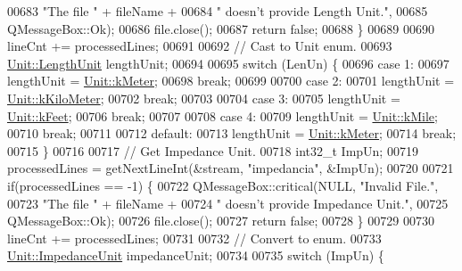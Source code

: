 \begin{DoxyCode}
00683                           \textcolor{stringliteral}{"The file "} + fileName +
00684                           \textcolor{stringliteral}{" doesn't provide Length Unit."},
00685                           QMessageBox::Ok);
00686     file.close();
00687     \textcolor{keywordflow}{return} \textcolor{keyword}{false};
00688   \}
00689 
00690   lineCnt += processedLines;
00691 
00692   \textcolor{comment}{// Cast to Unit enum.}
00693   \hyperlink{class_unit_a8c8921f7b225ad6063b1cb573425b9a0}{Unit::LengthUnit} lengthUnit;
00694 
00695   \textcolor{keywordflow}{switch} (LenUn) \{
00696   \textcolor{keywordflow}{case} 1:
00697     lengthUnit = \hyperlink{class_unit_a8c8921f7b225ad6063b1cb573425b9a0abfa41ebe7ee649a1f02c9b8ae570434b}{Unit::kMeter};
00698     \textcolor{keywordflow}{break};
00699 
00700   \textcolor{keywordflow}{case} 2:
00701     lengthUnit = \hyperlink{class_unit_a8c8921f7b225ad6063b1cb573425b9a0a1c04f3dd196dbe1832a2658215b0d919}{Unit::kKiloMeter};
00702     \textcolor{keywordflow}{break};
00703 
00704   \textcolor{keywordflow}{case} 3:
00705     lengthUnit = \hyperlink{class_unit_a8c8921f7b225ad6063b1cb573425b9a0a9ac9b167b0ebce477fb53d6ace04ddc8}{Unit::kFeet};
00706     \textcolor{keywordflow}{break};
00707 
00708   \textcolor{keywordflow}{case} 4:
00709     lengthUnit = \hyperlink{class_unit_a8c8921f7b225ad6063b1cb573425b9a0a2ebde742068bbee0510de32fbb4cd724}{Unit::kMile};
00710     \textcolor{keywordflow}{break};
00711 
00712   \textcolor{keywordflow}{default}:
00713     lengthUnit = \hyperlink{class_unit_a8c8921f7b225ad6063b1cb573425b9a0abfa41ebe7ee649a1f02c9b8ae570434b}{Unit::kMeter};
00714     \textcolor{keywordflow}{break};
00715   \}
00716 
00717   \textcolor{comment}{// Get Impedance Unit.}
00718   int32\_t ImpUn;
00719   processedLines = getNextLineInt(&stream, \textcolor{stringliteral}{"impedancia"}, &ImpUn);
00720 
00721   \textcolor{keywordflow}{if}(processedLines == -1) \{
00722     QMessageBox::critical(NULL, \textcolor{stringliteral}{"Invalid File."},
00723                           \textcolor{stringliteral}{"The file "} + fileName +
00724                           \textcolor{stringliteral}{" doesn't provide Impedance Unit."},
00725                           QMessageBox::Ok);
00726     file.close();
00727     \textcolor{keywordflow}{return} \textcolor{keyword}{false};
00728   \}
00729 
00730   lineCnt += processedLines;
00731 
00732   \textcolor{comment}{// Convert to enum.}
00733   \hyperlink{class_unit_a3747e779c805df24a71961290be3fbdf}{Unit::ImpedanceUnit} impedanceUnit;
00734 
00735   \textcolor{keywordflow}{switch} (ImpUn) \{

\end{DoxyCode}
